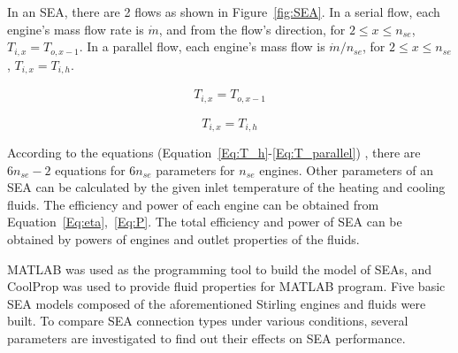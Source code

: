 In an SEA, there are 2 flows as shown in Figure~\ref{fig:SEA}. In a serial flow, each engine's mass flow rate is $\dot{m}$, and from the flow's direction, for $2\leqslant{}x\leqslant{}n_{se}$, $T_{i,x} = T_{o,x-1}$. In a parallel flow, each engine's mass flow is $\dot{m}/n_{se}$, for $2\leqslant{}x\leqslant{}n_{se}$, $T_{i,x} = T_{i,h}$.

\begin{equation}
	\begin{split}
		T_{i,x} = T_{o,x-1}
		\label{Eq:T_serial}
	\end{split}
\end{equation}

\begin{equation}
	T_{i,x} = T_{i,h}
	\label{Eq:T_parallel}
\end{equation}

According to the equations 
(Equation~\ref{Eq:T_h}-\ref{Eq:T_parallel})
, there are $6n_{se} - 2$ equations for $6n_{se}$ parameters for $n_{se}$ engines. Other parameters of an SEA can be calculated by the given inlet temperature of the heating and cooling fluids. The efficiency and power of each engine can be obtained from Equation~\ref{Eq:eta},~\ref{Eq:P}. The total efficiency and power of SEA can be obtained by powers of engines and outlet properties of the fluids.

MATLAB was used as the programming tool to build the model of SEAs, and CoolProp was used to provide fluid properties for MATLAB program. Five basic SEA models composed of the aforementioned Stirling engines and fluids were built. To compare SEA connection types under various conditions, several parameters are investigated to find out their effects on SEA performance.

